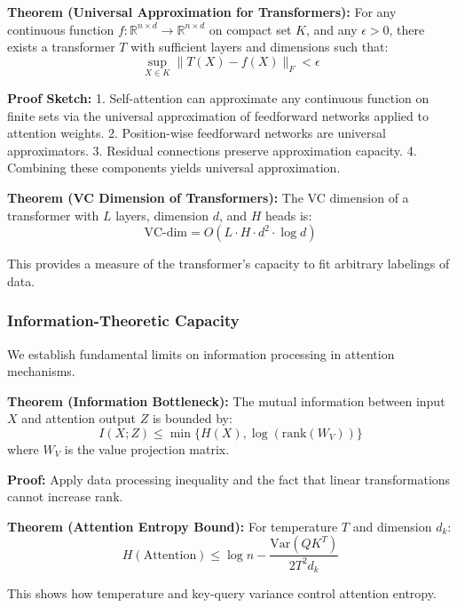 \documentclass[11pt]{article}
\begin{document}
\textbf{Theorem (Universal Approximation for Transformers):} For any continuous function $f: \mathbb{R}^{n \times d} \rightarrow \mathbb{R}^{n \times d}$ on compact set $K$, and any $\epsilon > 0$, there exists a transformer $T$ with sufficient layers and dimensions such that:
\begin{equation}
\sup_{X \in K} \|T(X) - f(X)\|_F < \epsilon
\end{equation}

\textbf{Proof Sketch:} 
1. Self-attention can approximate any continuous function on finite sets via the universal approximation of feedforward networks applied to attention weights.
2. Position-wise feedforward networks are universal approximators.
3. Residual connections preserve approximation capacity.
4. Combining these components yields universal approximation.

\textbf{Theorem (VC Dimension of Transformers):} The VC dimension of a transformer with $L$ layers, dimension $d$, and $H$ heads is:
\begin{equation}
\text{VC-dim} = O(L \cdot H \cdot d^2 \cdot \log d)
\end{equation}

This provides a measure of the transformer's capacity to fit arbitrary labelings of data.

\subsubsection{Information-Theoretic Capacity}

We establish fundamental limits on information processing in attention mechanisms.

\textbf{Theorem (Information Bottleneck):} The mutual information between input $X$ and attention output $Z$ is bounded by:
\begin{equation}
I(X; Z) \leq \min\{H(X), \log(\text{rank}(W_V))\}
\end{equation}
where $W_V$ is the value projection matrix.

\textbf{Proof:} Apply data processing inequality and the fact that linear transformations cannot increase rank.

\textbf{Theorem (Attention Entropy Bound):} For temperature $T$ and dimension $d_k$:
\begin{equation}
H(\text{Attention}) \leq \log n - \frac{\text{Var}(QK^T)}{2T^2 d_k}
\end{equation}

This shows how temperature and key-query variance control attention entropy.
\end{document}
